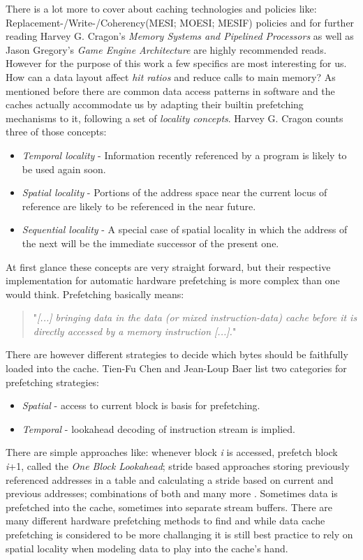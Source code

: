 There is a lot more to cover about caching technologies and policies like: Replacement-/Write-/Coherency(MESI; MOESI; MESIF) policies and for further reading Harvey G. Cragon's \textit{Memory Systems and Pipelined Processors} as well as Jason Gregory's \textit{Game Engine Architecture} are highly recommended reads. However for the purpose of this work a few specifics are most interesting for us.\\
How can a data layout affect \textit{hit ratios} and reduce calls to main memory? As mentioned before there are common data access patterns in software and the caches actually accommodate us by adapting their builtin prefetching mechanisms to it, following a set of \textit{locality concepts}. Harvey G. Cragon counts three of those concepts: 
\begin{itemize}
	\item \textit{Temporal locality} - Information recently referenced by a program is likely to be used again soon.
	\item \textit{Spatial locality} - Portions of the address space near the current locus of reference are likely to be referenced in the near future.
	\item \textit{Sequential locality} - A special case of spatial locality in which the address of the next will be the immediate successor of the present one.
\end{itemize}
At first glance these concepts are very straight forward, but their respective implementation for automatic hardware prefetching is more complex than one would think. Prefetching basically means:
\begin{quote}
"\textit{[...] bringing data in the data (or mixed instruction-data) cache before it is directly accessed by a memory instruction [...].}" 
\end{quote}
There are however different strategies to decide which bytes should be faithfully loaded into the cache. Tien-Fu Chen and Jean-Loup Baer list two categories for prefetching strategies: 
\begin{itemize}
	\item \textit{Spatial} - access to current block is basis for prefetching.
	\item \textit{Temporal} - lookahead decoding of instruction stream is implied.
\end{itemize}
There are simple approaches like: whenever block \textit{i} is accessed, prefetch block \textit{i}+1, called the \textit{One Block Lookahead}; stride based approaches storing previously referenced addresses in a table and calculating a stride based on current and previous addresses; combinations of both and many more .  Sometimes data is prefetched into the cache, sometimes into separate stream buffers. There are many different hardware prefetching methods to find and while data cache prefetching is considered to be more challanging  it is still best practice to rely on spatial locality when modeling data to play into the cache's hand.\\
